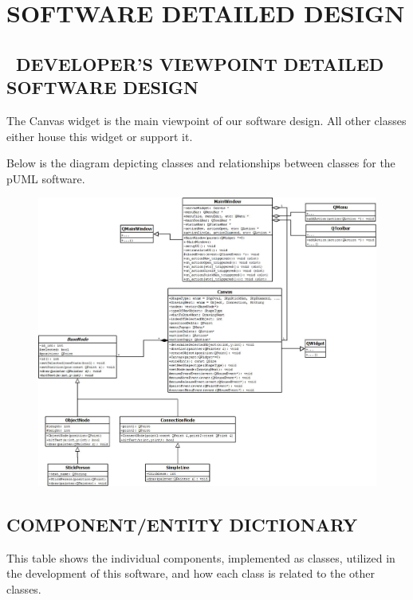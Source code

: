 \documentclass[twoside,letterpaper]{article}
\begin{document}
{\clearpage
\section{SOFTWARE DETAILED DESIGN}

\bigskip

\subsection[\ DEVELOPER{\textquoteright}S VIEWPOINT DETAILED SOFTWARE
DESIGN]{\foreignlanguage{english}{\ }\foreignlanguage{english}{DEVELOPER{\textquoteright}S
VIEWPOINT DETAILED SOFTWARE DESIGN}}

{\color{black}
The Canvas widget is the main viewpoint of our software design.  
All other classes either house this widget or support it.}

{\color{black}
Below is the diagram depicting classes and relationships between classes for the pUML software.}

\begin{figure}[h]
\centering
\includegraphics[width=6.5in]{DiaClassDiagram}
\end{figure}

\clearpage

\subsection[COMPONENT/ENTITY DICTIONARY]{\bfseries\color{black} COMPONENT/ENTITY DICTIONARY}
{\color{black}
This table shows the individual components, implemented as classes, utilized in the development of this software,
and how each class is related to the other classes.}

}
\end{document}
